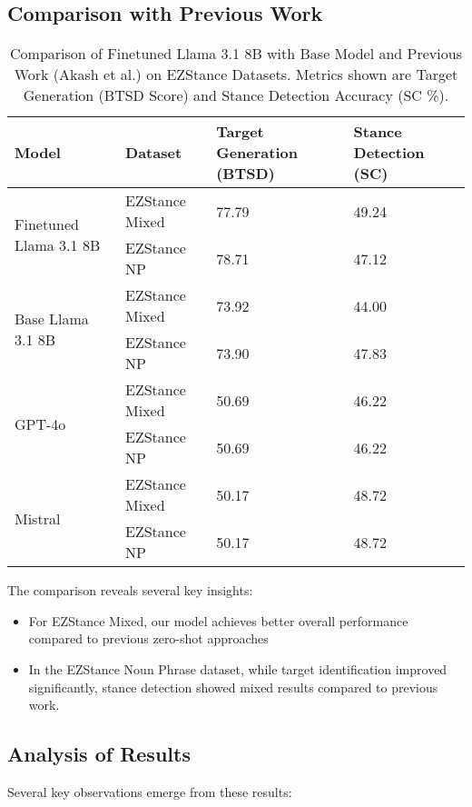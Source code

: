 \documentclass[twocolumn,11pt,letterpaper]{article}
\begin{document}
\subsection{Comparison with Previous Work}
\begin{table*}[!htbp]
\centering
\caption{Comparison of Finetuned Llama 3.1 8B with Base Model and Previous Work (Akash et al.) on EZStance Datasets. Metrics shown are Target Generation (BTSD Score) and Stance Detection Accuracy (SC \%).}
\label{tab:comparison}
\begin{tabular}{|p{}|p{}|p{}|p{}|}
\hline
\textbf{Model} & \textbf{Dataset} & \textbf{Target Generation (BTSD)} & \textbf{Stance Detection (SC)} \\
\hline
\multirow{2}{*}{Finetuned Llama 3.1 8B} 
& EZStance Mixed & 77.79 & 49.24 \\
\cline{2-4}
& EZStance NP & 78.71 & 47.12 \\
\hline
\multirow{2}{*}{Base Llama 3.1 8B} 
& EZStance Mixed & 73.92 & 44.00 \\
\cline{2-4}
& EZStance NP & 73.90 & 47.83 \\
\hline
\multirow{2}{*}{GPT-4o~\cite{akash2024}} 
& EZStance Mixed & 50.69 & 46.22 \\
\cline{2-4}
& EZStance NP & 50.69 & 46.22 \\
\hline
\multirow{2}{*}{Mistral~\cite{akash2024}} 
& EZStance Mixed & 50.17 & 48.72 \\
\cline{2-4}
& EZStance NP & 50.17 & 48.72 \\
\hline
\end{tabular}
\end{table*}

The comparison reveals several key insights:
\begin{itemize}
    \item For EZStance Mixed, our model achieves better overall performance compared to previous zero-shot approaches
    \item In the EZStance Noun Phrase dataset, while target identification improved significantly, stance detection showed mixed results compared to previous work.
\end{itemize}

\subsection{Analysis of Results}
Several key observations emerge from these results:
\end{document}
